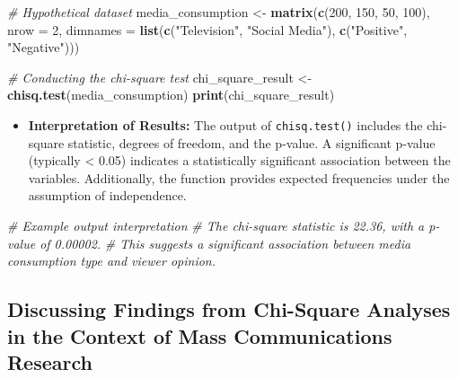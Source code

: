 \documentclass[
]{book}
\newenvironment{Shaded}{\begin{snugshade}}{\end{snugshade}}
\newcommand{\AttributeTok}[1]{\textcolor[rgb]{0.13,0.29,0.53}{#1}}
\newcommand{\CommentTok}[1]{\textcolor[rgb]{0.56,0.35,0.01}{\textit{#1}}}
\newcommand{\DecValTok}[1]{\textcolor[rgb]{0.00,0.00,0.81}{#1}}
\newcommand{\FunctionTok}[1]{\textcolor[rgb]{0.13,0.29,0.53}{\textbf{#1}}}
\newcommand{\NormalTok}[1]{#1}
\newcommand{\OtherTok}[1]{\textcolor[rgb]{0.56,0.35,0.01}{#1}}
\newcommand{\StringTok}[1]{\textcolor[rgb]{0.31,0.60,0.02}{#1}}
\providecommand{\tightlist}{%
  \setlength{\itemsep}{0pt}\setlength{\parskip}{0pt}}
\begin{document}
\begin{Shaded}
\begin{Highlighting}[]
\CommentTok{\# Hypothetical dataset}
\NormalTok{media\_consumption }\OtherTok{\textless{}{-}} \FunctionTok{matrix}\NormalTok{(}\FunctionTok{c}\NormalTok{(}\DecValTok{200}\NormalTok{, }\DecValTok{150}\NormalTok{, }\DecValTok{50}\NormalTok{, }\DecValTok{100}\NormalTok{), }\AttributeTok{nrow =} \DecValTok{2}\NormalTok{,}
                            \AttributeTok{dimnames =} \FunctionTok{list}\NormalTok{(}\FunctionTok{c}\NormalTok{(}\StringTok{"Television"}\NormalTok{, }\StringTok{"Social Media"}\NormalTok{),}
                                            \FunctionTok{c}\NormalTok{(}\StringTok{"Positive"}\NormalTok{, }\StringTok{"Negative"}\NormalTok{)))}

\CommentTok{\# Conducting the chi{-}square test}
\NormalTok{chi\_square\_result }\OtherTok{\textless{}{-}} \FunctionTok{chisq.test}\NormalTok{(media\_consumption)}
\FunctionTok{print}\NormalTok{(chi\_square\_result)}
\end{Highlighting}
\end{Shaded}

\begin{itemize}
\tightlist
\item
  \textbf{Interpretation of Results:} The output of \texttt{chisq.test()} includes the chi-square statistic, degrees of freedom, and the p-value. A significant p-value (typically \textless{} 0.05) indicates a statistically significant association between the variables. Additionally, the function provides expected frequencies under the assumption of independence.
\end{itemize}

\begin{Shaded}
\begin{Highlighting}[]
\CommentTok{\# Example output interpretation}
\CommentTok{\# The chi{-}square statistic is 22.36, with a p{-}value of 0.00002.}
\CommentTok{\# This suggests a significant association between media consumption type and viewer opinion.}
\end{Highlighting}
\end{Shaded}

\subsection*{Discussing Findings from Chi-Square Analyses in the Context of Mass Communications Research}\label{discussing-findings-from-chi-square-analyses-in-the-context-of-mass-communications-research}
\end{document}
